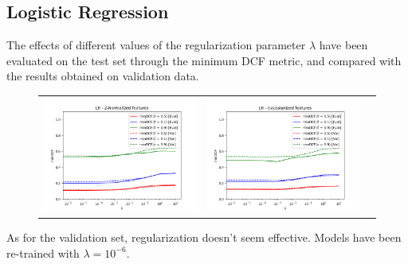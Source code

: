 \documentclass[12pt,a4paper]{article}
\begin{document}
\subsection{Logistic Regression}

The effects of different values of the regularization parameter \(\lambda\) have been evaluated on the test set through the minimum DCF metric, and compared with the results obtained on validation data.

\begin{figure}[H]
    \begin{center}
        \hspace*{-25pt}
        \begin{tabular}{ccc}
            \includegraphics[width = 200pt]{img/evaluation_plots/evaluation-comparison-lr-z-normalized.png} &
            \includegraphics[width = 200pt]{img/evaluation_plots/evaluation-comparison-lr-gaussianized.png}   \\
        \end{tabular}
    \end{center}
\end{figure}

\vspace*{-20pt}
As for the validation set, regularization doesn't seem effective. Models have been re-trained with \(\lambda = 10^{-6}\). \\
\end{document}
